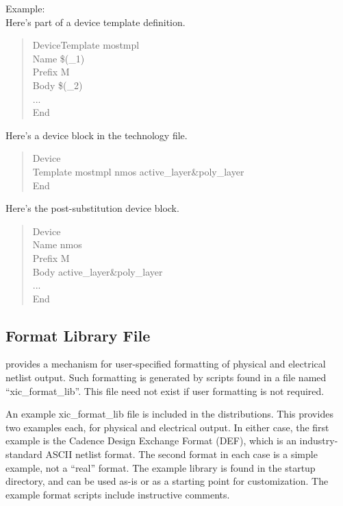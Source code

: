 Example:\\
Here's part of a device template definition.\\
\begin{quote}\vt
DeviceTemplate mostmpl\\
Name \$(\_1)\\
Prefix M\\
Body \$(\_2)\\
...\\
End
\end{quote}

Here's a device block in the technology file.\\
\begin{quote}\vt
Device\\
Template mostmpl nmos active\_layer\&poly\_layer\\
End
\end{quote}

Here's the post-substitution device block.\\
\begin{quote}\vt
Device\\
Name nmos\\
Prefix M\\
Body active\_layer\&poly\_layer\\
...\\
End
\end{quote}


\subsection{Format Library File}
\label{fmtlib}
{\Xic} provides a mechanism for user-specified formatting of physical
and electrical netlist output.  Such formatting is generated by
scripts found in a file named ``{\vt xic\_format\_lib}''.  This file
need not exist if user formatting is not required.

An example {\vt xic\_format\_lib} file is included in the
distributions.  This provides two examples each, for physical and
electrical output.  In either case, the first example is the Cadence
Design Exchange Format (DEF), which is an industry-standard ASCII
netlist format.  The second format in each case is a simple example,
not a ``real'' format.  The example library is found in the startup
directory, and can be used as-is or as a starting point for
customization.  The example format scripts include instructive
comments.


